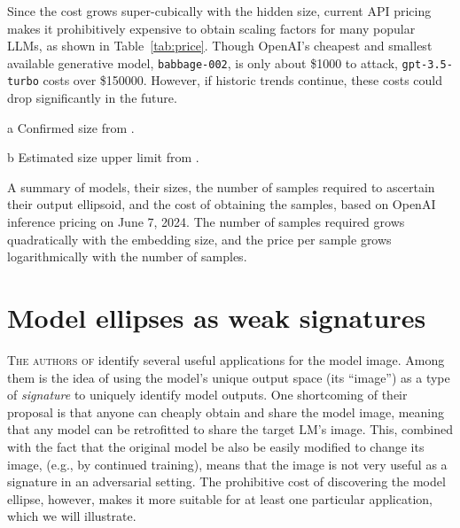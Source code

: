 \documentclass{article}
\begin{document}
Since the cost grows super-cubically with the hidden size, 
current API pricing makes it prohibitively expensive to obtain scaling factors for many popular LLMs, as shown in Table~\ref{tab:price}.
Though OpenAI's cheapest and smallest available generative model, \texttt{babbage-002}, is only about \$\num{1000} to attack, \texttt{gpt-3.5-turbo} costs over \$\num{150 000}.
However, if historic trends continue, these costs could drop significantly in the future.

\begin{table}
  \centering
  \small
  \begin{threeparttable}
  
    \begin{tablenotes}
    \item[a] Confirmed size from \citet{Carlini2024StealingPO}.
    \item[b] Estimated size upper limit from \citet{Finlayson2024LogitsOA}.
    \end{tablenotes}
  \end{threeparttable}
  \caption{
    A summary of models, their sizes, the number of samples required to ascertain their output ellipsoid, and the cost of obtaining the samples, based on OpenAI inference pricing on June 7, 2024. The number of samples required grows quadratically with the embedding size, and the price per sample grows logarithmically with the number of samples.
  }
  \label{tab:price}
\end{table}

\section{Model ellipses as weak signatures}

\lettrine{T}{he authors of \citet{Finlayson2024LogitsOA}} identify several useful applications for the model image. 
Among them is the idea of using the model's unique output space (its ``image'') 
as a type of \textit{signature} to uniquely identify model outputs.
One shortcoming of their proposal 
is that anyone can cheaply obtain and share the model image,
meaning that any model can be retrofitted to share the target LM's image. 
This, combined with the fact that the original model be also be easily modified to change its image, (e.g., by continued training), means that the image is not very useful as a signature in an adversarial setting.
The prohibitive cost of discovering the model ellipse, however, makes it more suitable for at least one particular application, which we will illustrate.
\end{document}
